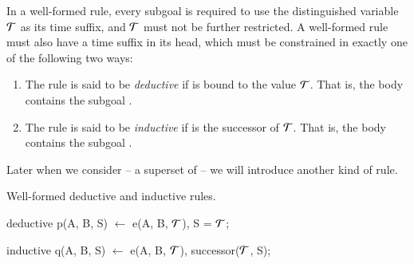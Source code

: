 In a well-formed \slang rule, every subgoal is required to use the
distinguished variable $\Tau$ as its time suffix, and $\Tau$ must not be
further restricted.  A well-formed \slang rule must also have a time suffix
 in its head, which must be constrained in exactly one of the
following two ways:

\begin{enumerate}

\item The rule is said to be \emph{deductive} if  is bound to the
value $\Tau$.  That is, the body contains the subgoal .

\item The rule is said to be {\em inductive} if  is the successor of
$\Tau$.  That is, the body contains the subgoal .



\end{enumerate}


Later when we consider \lang -- a superset of \slang -- we will
introduce another kind of rule.

\begin{example}
Well-formed deductive and inductive rules.

\begin{Dedalus}
deductive
p(A, B, S) \(\leftarrow\) e(A, B, \(\Tau\)), S = \(\Tau\);

inductive 
q(A, B, S) \(\leftarrow\) e(A, B, \(\Tau\)), successor(\(\Tau\), S);
\end{Dedalus}
\end{example}

